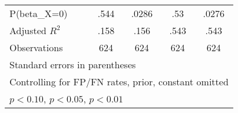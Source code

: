 {\begin{tabular}{l*{4}{c}}
\hline
P(beta\_X=0)     &     .544         &    .0286         &      .53         &    .0276         \\
Adjusted \(R^{2}\)&     .158         &     .156         &     .543         &     .543         \\
Observations    &      624         &      624         &      624         &      624         \\
\hline\hline
\multicolumn{5}{l}{\footnotesize Standard errors in parentheses}\\
\multicolumn{5}{l}{\footnotesize Controlling for FP/FN rates, prior, constant omitted}\\
\multicolumn{5}{l}{\footnotesize \sym{*} \(p<0.10\), \sym{**} \(p<0.05\), \sym{***} \(p<0.01\)}\\
\end{tabular}
}
